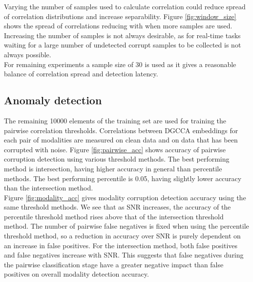 Varying the number of samples used to calculate correlation could reduce spread of correlation distributions and increase separability. Figure \ref{fig:window_size} shows the spread of correlations reducing with when more samples are used. Increasing the number of samples is not always desirable, as for real-time tasks waiting for a large number of undetected corrupt samples to be collected is not always possible.\\

For remaining experiments a sample size of 30 is used as it gives a reasonable balance of correlation spread and detection latency.\\

\subsection{Anomaly detection}
The remaining 10000 elements of the training set are used for training the pairwise correlation thresholds. Correlations between DGCCA embeddings for each pair of modalities are measured on clean data and on data that has been corrupted with noise. Figure \ref{fig:pairwise_acc} shows accuracy of pairwise corruption detection using various threshold methods. The best performing method is intersection, having higher accuracy in general than percentile methods. The best performing percentile is 0.05, having slightly lower accuracy than the intersection method.\\

Figure \ref{fig:modality_acc} gives modality corruption detection accuracy using the same threshold methods. We see that as SNR increases, the accuracy of the percentile threshold method rises above that of the intersection threshold method. The number of pairwise false negatives is fixed when using the percentile threshold method, so a reduction in accuracy over SNR is purely dependent on an increase in false positives. For the intersection method, both false positives and false negatives increase with SNR. This suggests that false negatives during the pairwise classification stage have a greater negative impact than false positives on overall modality detection accuracy.\\

